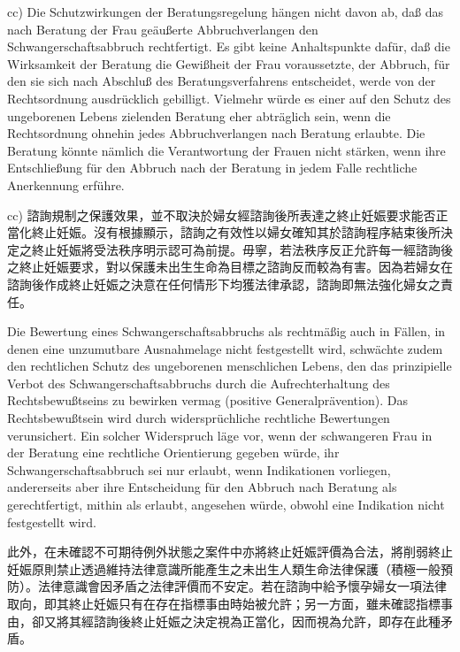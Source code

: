 \documentclass[12pt]{article}
\begin{document}
\begin{sourcepara}[title={原文D.100}]
cc) Die Schutzwirkungen der Beratungsregelung hängen nicht davon ab, daß das nach Beratung der Frau geäußerte Abbruchverlangen den Schwangerschaftsabbruch rechtfertigt. Es gibt keine Anhaltspunkte dafür, daß die Wirksamkeit der Beratung die Gewißheit der Frau voraussetzte, der Abbruch, für den sie sich nach Abschluß des Beratungsverfahrens entscheidet, werde von der Rechtsordnung ausdrücklich gebilligt. Vielmehr würde es einer auf den Schutz des ungeborenen Lebens zielenden Beratung eher abträglich sein, wenn die Rechtsordnung ohnehin jedes Abbruchverlangen nach Beratung erlaubte. Die Beratung könnte nämlich die Verantwortung der Frauen nicht stärken, wenn ihre Entschließung für den Abbruch nach der Beratung in jedem Falle rechtliche Anerkennung erführe.
\end{sourcepara}
\begin{transpara}
cc) 諮詢規制之保護效果，並不取決於婦女經諮詢後所表達之終止妊娠要求能否正當化終止妊娠。沒有根據顯示，諮詢之有效性以婦女確知其於諮詢程序結束後所決定之終止妊娠將受法秩序明示認可為前提。毋寧，若法秩序反正允許每一經諮詢後之終止妊娠要求，對以保護未出生生命為目標之諮詢反而較為有害。因為若婦女在諮詢後作成終止妊娠之決意在任何情形下均獲法律承認，諮詢即無法強化婦女之責任。
\end{transpara}

\begin{sourcepara}[title={原文D.101}]
Die Bewertung eines Schwangerschaftsabbruchs als rechtmäßig auch in Fällen, in denen eine unzumutbare Ausnahmelage nicht festgestellt wird, schwächte zudem den rechtlichen Schutz des ungeborenen menschlichen Lebens, den das prinzipielle Verbot des Schwangerschaftsabbruchs durch die Aufrechterhaltung des Rechtsbewußtseins zu bewirken vermag (positive Generalprävention). Das Rechtsbewußtsein wird durch widersprüchliche rechtliche Bewertungen verunsichert. Ein solcher Widerspruch läge vor, wenn der schwangeren Frau in der Beratung eine rechtliche Orientierung gegeben würde, ihr Schwangerschaftsabbruch sei nur erlaubt, wenn Indikationen vorliegen, andererseits aber ihre Entscheidung für den Abbruch nach Beratung als gerechtfertigt, mithin als erlaubt, angesehen würde, obwohl eine Indikation nicht festgestellt wird.
\end{sourcepara}
\begin{transpara}
此外，在未確認不可期待例外狀態之案件中亦將終止妊娠評價為合法，將削弱終止妊娠原則禁止透過維持法律意識所能產生之未出生人類生命法律保護（積極一般預防）。法律意識會因矛盾之法律評價而不安定。若在諮詢中給予懷孕婦女一項法律取向，即其終止妊娠只有在存在指標事由時始被允許；另一方面，雖未確認指標事由，卻又將其經諮詢後終止妊娠之決定視為正當化，因而視為允許，即存在此種矛盾。
\end{transpara}
\end{document}
